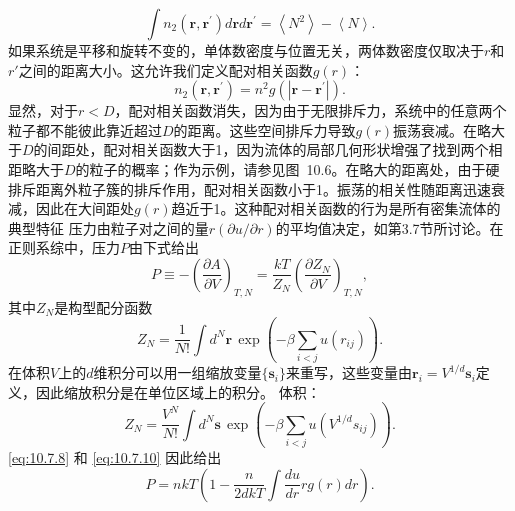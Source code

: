 \begin{equation}\tag{10.7.4}\label{eq:10.7.4}
\int n _ { 2 } ( \pmb { r } , \pmb { r } ^{\prime} ) d \pmb { r } d \pmb { r } ^{\prime} = \left\langle N ^{2} \right\rangle - \left\langle N \right\rangle .
\end{equation}
如果系统是平移和旋转不变的，单体数密度与位置无关，两体数密度仅取决于\(r\)和\(r'\)之间的距离大小。这允许我们定义配对相关函数\(g(r)\)：
\begin{equation}\tag{10.7.5}\label{eq:10.7.5}
n _ { 2 } ( \boldsymbol { r } , \boldsymbol { r } ^{\prime} ) = n ^{2} g \left( \left| \boldsymbol { r } - \boldsymbol { r } ^{\prime} \right| \right) .
\end{equation}
显然，对于\(r < D\)，配对相关函数消失，因为由于无限排斥力，系统中的任意两个粒子都不能彼此靠近超过\(D\)的距离。这些空间排斥力导致\(g(r)\)振荡衰减。在略大于\(D\)的间距处，配对相关函数大于1，因为流体的局部几何形状增强了找到两个相距略大于\(D\)的粒子的概率；作为示例，请参见图~10.6。在略大的距离处，由于硬排斥距离外粒子簇的排斥作用，配对相关函数小于1。振荡的相关性随距离迅速衰减，因此在大间距处\(g(r)\)趋近于1。这种配对相关函数的行为是所有密集流体的典型特征
压力由粒子对之间的量\(r(\partial u/\partial r)\)的平均值决定，如第3.7节所讨论。在正则系综中，压力\(P\)由下式给出
\begin{equation}\tag{10.7.6}\label{eq:10.7.6}
P \equiv - \left( \frac { \partial A } { \partial V } \right) _ { T , N } = \frac { k T } { Z _ { N } } \left( \frac { \partial Z _ { N } } { \partial V } \right) _ { T , N } ,
\end{equation}
其中\(Z_{N}\)是构型配分函数
\begin{equation}\tag{10.7.7}\label{eq:10.7.7}
Z _ { N } = \frac { 1 } { N ! } \int d ^{N} \mathbf { r } \, \exp \left( - \beta \sum _ { i < j } u ( r _ { i j } ) \right) .
\end{equation}
在体积\(V\)上的\(d\)维积分可以用一组缩放变量\(\{\mathbf{s}_i\}\)来重写，这些变量由\(\mathbf{r}_i = V^{1/d}\mathbf{s}_i\)定义，因此缩放积分是在单位区域上的积分。
体积：
\begin{equation}\tag{10.7.8}\label{eq:10.7.8}
Z _ { N } = \frac { V ^{N} } { N ! } \int d ^{N} \mathbf { s } \, \exp \left( - \beta \sum _ { i < j } u ( V ^{1 / d} s _ { i j } ) \right) .
\end{equation}
\autoref{eq:10.7.8} 和 \autoref{eq:10.7.10} 因此给出
\begin{equation}\tag{10.7.9}\label{eq:10.7.9}
P = n k T \left( 1 - \frac { n } { 2 d k T } \int \frac { d u } { d r } r g ( r ) d r \right) .
\end{equation}
